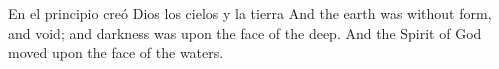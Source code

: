 
\begin{biblechapter} %
	En el principio creó Dios los cielos y la tierra
	\verse And the earth was without form, and void; and darkness was upon the face of the deep. And the Spirit of God moved upon the face of the waters.
\end{biblechapter}
